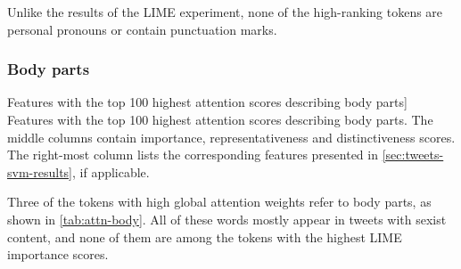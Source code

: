 Unlike the results of the LIME experiment, none of the high-ranking tokens are personal pronouns or contain punctuation marks.

\subsubsection{Body parts}
\begin{table}[htbp]
    
    \caption
    [Features with the top 100 highest attention scores describing body parts]
    {Features with the top 100 highest attention scores describing body parts.
    The middle columns contain importance, representativeness and distinctiveness scores.
    The right-most column lists the corresponding features presented in \autoref{sec:tweets-svm-results}, if applicable.
    }
    \label{tab:attn-body}
\end{table}

Three of the tokens with high global attention weights refer to body parts, as shown in \autoref{tab:attn-body}.
All of these words mostly appear in tweets with sexist content, and none of them are among the tokens with the highest LIME importance scores.
